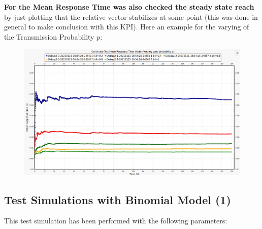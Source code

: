 \textbf{For the Mean Response Time was also checked the steady state reach} by just plotting that the relative vector stabilizes at some point (this was done in general to make conclusion with this KPI). Here an example for the varying of the Transmission Probability $p$:
\begin{figure}[H]
	\centering
	\includegraphics[width=\textwidth]{img/ContinuityTest_ResponseTime_VectorP.png}
	\label {img: responseTimeConvergence}
\end{figure}
\newpage
\subsection{Test Simulations with Binomial Model (1)}
This test simulation has been performed with the following parameters:
